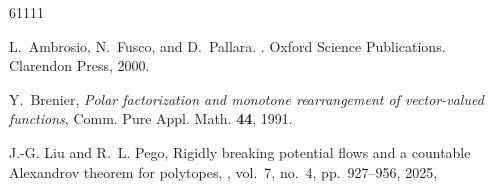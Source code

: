\documentclass[11pt, twoside, reqno]{amsart}
\theoremstyle{definition} \newtheorem{definition}{Definition}[section]
\theoremstyle{definition} \newtheorem{remark}[definition]{Remark}
\theoremstyle{plain} \newtheorem{lemma}[definition]{Lemma}
\theoremstyle{plain} \newtheorem{proposition}[definition]{Proposition}
\theoremstyle{plain} \newtheorem{theorem}[definition]{Theorem}
\theoremstyle{plain} \newtheorem{corollary}[definition]{Corollary}
\theoremstyle{definition} \newtheorem{example}[definition]{Example}
\theoremstyle{plain} \newtheorem{claim}[clai]{Claim}
\theoremstyle{definition} \newtheorem{assumption}[definition]{Assumption}
\newcommand{\1}{\mathbbm 1}
\numberwithin{equation}{section} %
\theoremstyle{plain} \newtheorem*{theorem*}{Theorem}
\theoremstyle{plain} \newtheorem{mthm}[maintheorem]{Main Theorem}
\theoremstyle{plain} \newtheorem*{mthm*}{Main Theorem}
\theoremstyle{plain} \newtheorem*{conjecture*}{Conjecture}
\theoremstyle{plain} \newtheorem{conjecture}[definition]{Conjecture}
\theoremstyle{plain} \newtheorem*{problem*}{Problem}
\begin{document}
\begin{thebibliography}{61111}

L.~Ambrosio, N.~Fusco, and D.~Pallara.
.
\newblock Oxford Science Publications. Clarendon Press, 2000.


Y.~Brenier,
\emph{Polar factorization and monotone rearrangement of vector-valued functions},
Comm. Pure Appl. Math. \textbf{44}, 1991.

J.-G. Liu and R.~L. Pego,
\newblock Rigidly breaking potential flows and a countable Alexandrov theorem for polytopes,
, vol.~7, no.~4, pp.~927–956, 2025,


\end{thebibliography}
\end{document}
